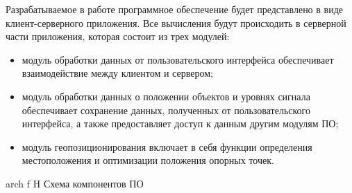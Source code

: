 
Разрабатываемое в работе программное обеспечение будет представлено в виде клиент-серверного приложения. Все вычисления будут происходить в серверной части приложения, которая состоит из трех модулей:

\begin{itemize}[label=---,left=0.49cm]
    \item модуль обработки данных от пользовательского интерфейса обеспечивает взаимодействие между клиентом и сервером;
    \item модуль обработки данных о положении объектов и уровнях сигнала обеспечивает сохранение данных, полученных от пользовательского интерфейса, а также предоставляет доступ к данным другим модулям ПО;
    \item модуль геопозиционирования включает в себя функции определения местоположения и оптимизации положения опорных точек.
\end{itemize}

    {arch}
    {f}
    {H}
    {\linewidth}
    {Схема компонентов ПО}
